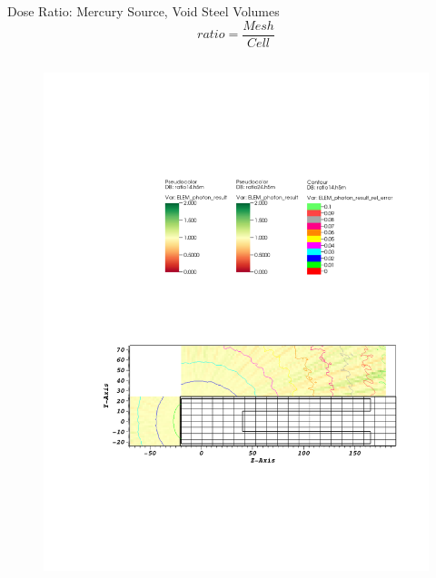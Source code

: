 \documentclass{beamer}
\begin{document}
\begin{frame}{Dose Ratio: Mercury Source, Void Steel Volumes}
	\begin{equation}
		ratio = \frac{Mesh}{Cell}
	\end{equation}
\begin{columns}[T]

        \begin{figure}
                \centering
		\includegraphics[scale=0.49,trim={2.5cm 6cm 1cm 15cm},clip]{figs/ratio_mer_void.pdf}
        \end{figure}


\end{columns}
\end{frame}
\end{document}
